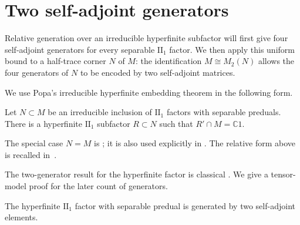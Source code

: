 \section{Two self-adjoint generators}
\label{sec:two-generators}

Relative generation over an irreducible hyperfinite subfactor will first
give four self-adjoint generators for every separable $\mathrm{II}_1$
factor. We then apply this
uniform bound to a half-trace corner $N$ of $M$: the identification
$M\cong M_2(N)$ allows the four generators of $N$ to be encoded by two
self-adjoint matrices.

We use Popa's irreducible hyperfinite embedding theorem in the
following form.

\begin{theorem}[Popa]
\label{thm:irreducible-hyperfinite}
Let $N\subset M$ be an irreducible inclusion of $\mathrm{II}_1$
factors with separable preduals. There is a hyperfinite
$\mathrm{II}_1$ subfactor $R\subset N$ such that
$R'\cap M=\mathbb C1$.
\end{theorem}

The special case $N=M$ is
\cite[Corollary~4.1]{Popa1981}; it is also used explicitly in
\cite[proof of Theorem~3.8]{Sherman2012}. The relative form above is
recalled in~\cite[Introduction]{Popa2021Ergodic}.

The two-generator result for the hyperfinite factor is classical
\cite{SuzukiSaito1963}. We give a tensor-model proof for the later
count of generators.

\begin{lemma}
\label{lem:hyperfinite-generators}
The hyperfinite $\mathrm{II}_1$ factor with separable predual is
generated by two self-adjoint elements.
\end{lemma}

